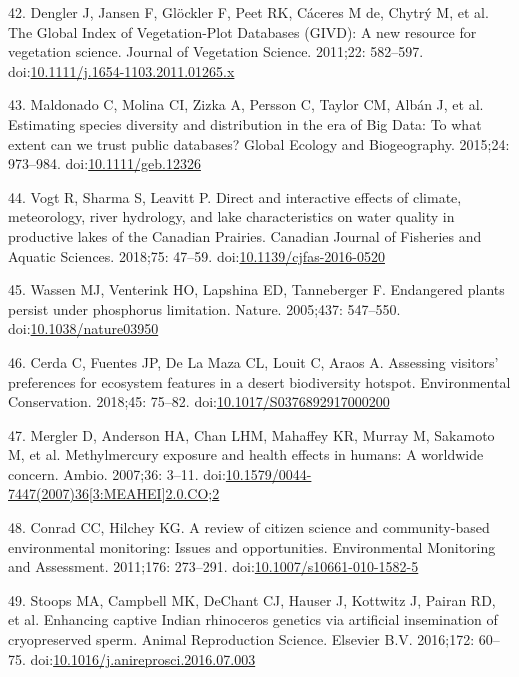 \documentclass[10pt,letterpaper]{article}
\begin{document}
\hypertarget{ref-Dengler2011}{}
42. Dengler J, Jansen F, Glöckler F, Peet RK, Cáceres M de, Chytrý M, et
al. The Global Index of Vegetation-Plot Databases (GIVD): A new resource
for vegetation science. Journal of Vegetation Science. 2011;22:
582--597.
doi:\href{https://doi.org/10.1111/j.1654-1103.2011.01265.x}{10.1111/j.1654-1103.2011.01265.x}

\hypertarget{ref-Maldonado2015}{}
43. Maldonado C, Molina CI, Zizka A, Persson C, Taylor CM, Albán J, et
al. Estimating species diversity and distribution in the era of Big
Data: To what extent can we trust public databases? Global Ecology and
Biogeography. 2015;24: 973--984.
doi:\href{https://doi.org/10.1111/geb.12326}{10.1111/geb.12326}

\hypertarget{ref-Vogt2018}{}
44. Vogt R, Sharma S, Leavitt P. Direct and interactive effects of
climate, meteorology, river hydrology, and lake characteristics on water
quality in productive lakes of the Canadian Prairies. Canadian Journal
of Fisheries and Aquatic Sciences. 2018;75: 47--59.
doi:\href{https://doi.org/10.1139/cjfas-2016-0520}{10.1139/cjfas-2016-0520}

\hypertarget{ref-Wassen2005}{}
45. Wassen MJ, Venterink HO, Lapshina ED, Tanneberger F. Endangered
plants persist under phosphorus limitation. Nature. 2005;437: 547--550.
doi:\href{https://doi.org/10.1038/nature03950}{10.1038/nature03950}

\hypertarget{ref-Cerda2018}{}
46. Cerda C, Fuentes JP, De La Maza CL, Louit C, Araos A. Assessing
visitors' preferences for ecosystem features in a desert biodiversity
hotspot. Environmental Conservation. 2018;45: 75--82.
doi:\href{https://doi.org/10.1017/S0376892917000200}{10.1017/S0376892917000200}

\hypertarget{ref-Mergler2007}{}
47. Mergler D, Anderson HA, Chan LHM, Mahaffey KR, Murray M, Sakamoto M,
et al. Methylmercury exposure and health effects in humans: A worldwide
concern. Ambio. 2007;36: 3--11.
doi:\href{https://doi.org/10.1579/0044-7447(2007)36\%5B3:MEAHEI\%5D2.0.CO;2}{10.1579/0044-7447(2007)36{[}3:MEAHEI{]}2.0.CO;2}

\hypertarget{ref-Conrad2011}{}
48. Conrad CC, Hilchey KG. A review of citizen science and
community-based environmental monitoring: Issues and opportunities.
Environmental Monitoring and Assessment. 2011;176: 273--291.
doi:\href{https://doi.org/10.1007/s10661-010-1582-5}{10.1007/s10661-010-1582-5}

\hypertarget{ref-Stoops2016}{}
49. Stoops MA, Campbell MK, DeChant CJ, Hauser J, Kottwitz J, Pairan RD,
et al. Enhancing captive Indian rhinoceros genetics via artificial
insemination of cryopreserved sperm. Animal Reproduction Science.
Elsevier B.V. 2016;172: 60--75.
doi:\href{https://doi.org/10.1016/j.anireprosci.2016.07.003}{10.1016/j.anireprosci.2016.07.003}

\nolinenumbers
\end{document}
